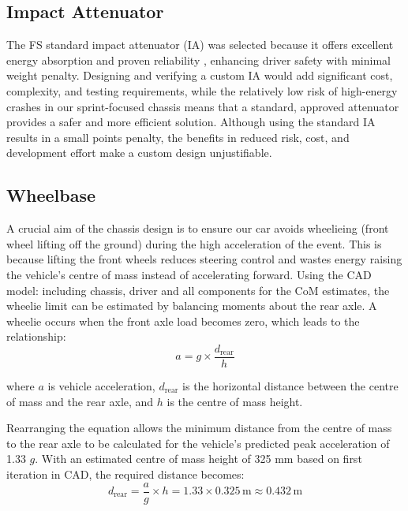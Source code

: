 \documentclass[11pt, a4paper]{report}
\numberwithin{equation}{section}
\begin{document}
\begin{refsection}
\subsection{Impact Attenuator}

The FS standard impact attenuator (IA) \cite{fsae_rules_2025} was selected because it offers excellent energy absorption and proven reliability \cite{dewesoft2025ia}, enhancing driver safety with minimal weight penalty. Designing and verifying a custom IA would add significant cost, complexity, and testing requirements, while the relatively low risk of high-energy crashes in our sprint-focused chassis means that a standard, approved attenuator provides a safer and more efficient solution. Although using the standard IA results in a small points penalty, the benefits in reduced risk, cost, and development effort make a custom design unjustifiable.

\subsection{Wheelbase}
\label{sec:wheelbase_mass_distribution}

A crucial aim of the chassis design is to ensure our car avoids wheelieing (front wheel lifting off the ground) during the high acceleration of the event. This is because lifting the front wheels reduces steering control and wastes energy raising the vehicle’s centre of mass instead of accelerating forward. Using the CAD model: including chassis, driver and all components for the  CoM estimates, the wheelie limit can be estimated by balancing moments about the rear axle. A wheelie occurs when the front axle load becomes zero, which leads to the relationship:
\vspace{-1pt}
\begin{equation}
    a = g \times \frac{d_{\text{rear}}}{h}
\end{equation}

where \( a \) is vehicle acceleration, \( d_{\text{rear}} \) is the horizontal distance between the centre of mass and the rear axle, and \( h \) is the centre of mass height.

Rearranging the equation allows the minimum distance from the centre of mass to the rear axle to be calculated for the vehicle’s predicted peak acceleration of 1.33 \( g\). With an estimated centre of mass height of 325 mm based on first iteration in CAD, the required distance becomes:
 \vspace{-2pt}
\begin{equation}
    d_{\text{rear}} = \frac{a}{g} \times h = 1.33 \times 0.325\,\text{m} \approx 0.432\,\text{m}
\end{equation}


\end{refsection}
\end{document}
